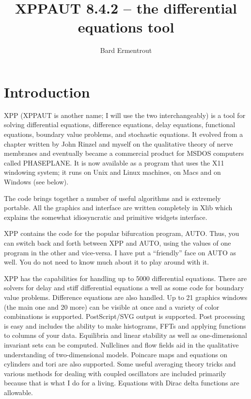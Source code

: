 \documentclass{article}
\title{XPPAUT 8.4.2 -- the differential equations tool}
\author{Bard Ermentrout}
\begin{document}
\maketitle
\tableofcontents
\newpage
\section{Introduction} XPP (XPPAUT is another name; I will use the two
interchangeably)
  is a tool for solving differential
equations,
 difference 
equations, delay equations, functional equations, boundary value
problems, and stochastic equations. 
 It evolved 
from a chapter written by John Rinzel and myself on the qualitative
 theory of nerve membranes and eventually became a commercial product
 for MSDOS computers called PHASEPLANE.  It is now available as a
program that uses the X11 windowing system; it runs on Unix and Linux machines, on Macs and on
Windows (see below).  

 The code 
brings together a number of useful algorithms and is extremely portable. 
 All the graphics and interface are written completely in Xlib which explains 
the somewhat idiosyncratic and primitive widgets interface.  

XPP contains the code for the popular bifurcation
program, AUTO.  Thus, you can switch back and forth between XPP and
AUTO, using the values of one program in the other and vice-versa.  I
have put a ``friendly'' face on AUTO as well.  You do not need to know
much about it to play around with it.

XPP has the capabilities for handling up to 5000 differential equations. 
 There are solvers for delay and stiff differential equations a well as
 some code for boundary value problems.  Difference equations are also
 handled.  Up to 21 graphics windows (the main one and 20 more) can be visible at once and a variety
 of color combinations is supported.  PostScript/SVG output
 is supported.  Post processing is easy and includes the ability to make
 histograms, FFTs and applying functions to columns of your data.
Equilibria
 and linear stability as well as one-dimensional invariant sets can be
 computed.  Nullclines and flow fields aid in the qualitative understanding
 of two-dimensional models.  Poincare maps and equations on cylinders and
 tori are also supported.  Some useful averaging theory tricks and various
 methods for dealing with coupled oscillators are included primarily because
 that is what I do for a living. Equations with Dirac delta functions
are allowable.
\end{document}
